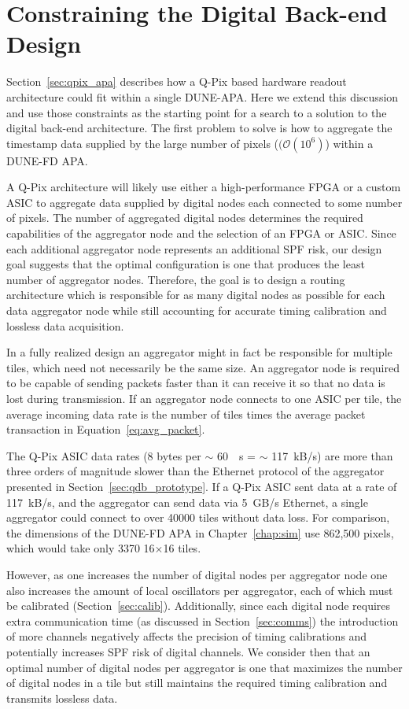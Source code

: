 \section{Constraining the Digital Back-end Design}\label{sec:digital_constraints}
Section~\ref{sec:qpix_apa} describes how a Q-Pix based hardware readout architecture could fit within a single DUNE-APA.
Here we extend this discussion and use those constraints as the starting point for a search to a solution to the digital back-end architecture.
The first problem to solve is how to aggregate the timestamp data supplied by the large number of pixels ($(\mathcal{O}(10^{6})$) within a DUNE-FD APA.

A Q-Pix architecture will likely use either a high-performance FPGA or a custom ASIC to aggregate data supplied by digital nodes each connected to some number of pixels.
The number of aggregated digital nodes determines the required capabilities of the aggregator node and the selection of an FPGA or ASIC.
Since each additional aggregator node represents an additional SPF risk, our design goal suggests that the optimal configuration is one that produces the least number of aggregator nodes.
Therefore, the goal is to design a routing architecture which is responsible for as many digital nodes as possible for each data aggregator node while still accounting for accurate timing calibration and lossless data acquisition.

In a fully realized design an aggregator might in fact be responsible for multiple tiles, which need not necessarily be the same size.
An aggregator node is required to be capable of sending packets faster than it can receive it so that no data is lost during transmission.
If an aggregator node connects to one ASIC per tile, the average incoming data rate is the number of tiles times the average packet transaction in Equation~\ref{eq:avg_packet}.

The Q-Pix ASIC data rates (8 bytes per $\sim$ 60~\unit{\mu s} = $\sim$ 117~\unit{kB/s}) are more than three orders of magnitude slower than the Ethernet protocol of the aggregator presented in Section~\ref{sec:qdb_prototype}.
If a Q-Pix ASIC sent data at a rate of 117~\unit{kB/s}, and the aggregator can send data via 5~\unit{GB/s} Ethernet, a single aggregator could connect to over 40000 tiles without data loss.
For comparison, the dimensions of the DUNE-FD APA in Chapter~\ref{chap:sim} use 862,500 pixels, which would take only 3370 16$\times$16 tiles.

However, as one increases the number of digital nodes per aggregator node one also increases the amount of local oscillators per aggregator, each of which must be calibrated (Section~\ref{sec:calib}).
Additionally, since each digital node requires extra communication time (as discussed in Section~\ref{sec:comms}) the introduction of more channels negatively affects the precision of timing calibrations and potentially increases SPF risk of digital channels.
We consider then that an optimal number of digital nodes per aggregator is one that maximizes the number of digital nodes in a tile but still maintains the required timing calibration and transmits lossless data.

